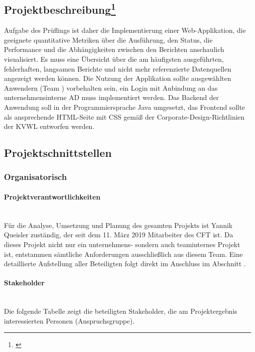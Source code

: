 \subsection[Projektbeschreibung]{Projektbeschreibung\footnote{\cite{Projektantrag}}} 
\label{sec:Projektbeschreibung}
\begin{displayquote}
	Aufgabe des Prüflings \autorName\xspace ist daher die Implementierung einer Web-Applikation, die geeignete quantitative Metriken über die Ausführung, den Status, die Performance und die Abhängigkeiten zwischen den Berichten anschaulich visualisiert. Es muss eine Übersicht über die am häufigsten ausgeführten, fehlerhaften, langsamen Berichte und nicht mehr referenzierte Datenquellen angezeigt werden können. Die Nutzung der Applikation sollte ausgewählten Anwendern (Team \teamName) vorbehalten sein, \dahe ein Login mit Anbindung an das unternehmensinterne \ac{AD} muss implementiert werden. Das Backend der Anwendung soll in der Programmiersprache Java umgesetzt, das Frontend sollte als ansprechende HTML-Seite mit CSS gemäß der Corporate-Design-Richtlinien der \ac{KVWL} entworfen werden.
\end{displayquote}

\subsection{Projektschnittstellen} 
\label{sec:Projektschnittstellen}

\subsubsection{Organisatorisch} 
\label{sec:Projektschnittstellen:Organisatorisch}

\paragraph{Projektverantwortlichkeiten} ~\\
\label{p:Projektverantwortlichkeiten}
Für die Analyse, Umsetzung und Planung des gesamten Projekts ist Yannik Queisler zuständig, der seit dem 11. März 2019 Mitarbeiter des \ac{CFT} \teamName ist. Da dieses Projekt nicht nur ein unternehmens- sondern auch teaminternes Projekt ist, entstammen sämtliche Anforderungen ausschließlich aus diesem Team. Eine detaillierte Aufstellung aller Beteiligten folgt direkt im Anschluss im Abschnitt .

\paragraph{Stakeholder} ~\\
\label{p:Stakeholder}
Die folgende Tabelle zeigt die beteiligten Stakeholder, \dahe die am Projektergebnis interessierten Personen (Anspruchsgruppe).

